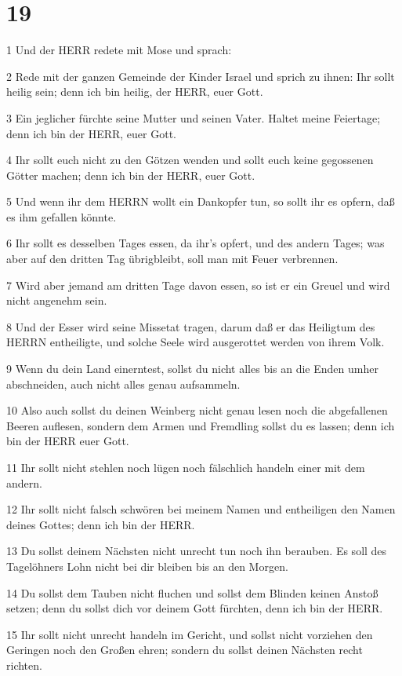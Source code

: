 \chapter{19}

\par 1 Und der HERR redete mit Mose und sprach:
\par 2 Rede mit der ganzen Gemeinde der Kinder Israel und sprich zu ihnen: Ihr sollt heilig sein; denn ich bin heilig, der HERR, euer Gott.
\par 3 Ein jeglicher fürchte seine Mutter und seinen Vater. Haltet meine Feiertage; denn ich bin der HERR, euer Gott.
\par 4 Ihr sollt euch nicht zu den Götzen wenden und sollt euch keine gegossenen Götter machen; denn ich bin der HERR, euer Gott.
\par 5 Und wenn ihr dem HERRN wollt ein Dankopfer tun, so sollt ihr es opfern, daß es ihm gefallen könnte.
\par 6 Ihr sollt es desselben Tages essen, da ihr's opfert, und des andern Tages; was aber auf den dritten Tag übrigbleibt, soll man mit Feuer verbrennen.
\par 7 Wird aber jemand am dritten Tage davon essen, so ist er ein Greuel und wird nicht angenehm sein.
\par 8 Und der Esser wird seine Missetat tragen, darum daß er das Heiligtum des HERRN entheiligte, und solche Seele wird ausgerottet werden von ihrem Volk.
\par 9 Wenn du dein Land einerntest, sollst du nicht alles bis an die Enden umher abschneiden, auch nicht alles genau aufsammeln.
\par 10 Also auch sollst du deinen Weinberg nicht genau lesen noch die abgefallenen Beeren auflesen, sondern dem Armen und Fremdling sollst du es lassen; denn ich bin der HERR euer Gott.
\par 11 Ihr sollt nicht stehlen noch lügen noch fälschlich handeln einer mit dem andern.
\par 12 Ihr sollt nicht falsch schwören bei meinem Namen und entheiligen den Namen deines Gottes; denn ich bin der HERR.
\par 13 Du sollst deinem Nächsten nicht unrecht tun noch ihn berauben. Es soll des Tagelöhners Lohn nicht bei dir bleiben bis an den Morgen.
\par 14 Du sollst dem Tauben nicht fluchen und sollst dem Blinden keinen Anstoß setzen; denn du sollst dich vor deinem Gott fürchten, denn ich bin der HERR.
\par 15 Ihr sollt nicht unrecht handeln im Gericht, und sollst nicht vorziehen den Geringen noch den Großen ehren; sondern du sollst deinen Nächsten recht richten.
